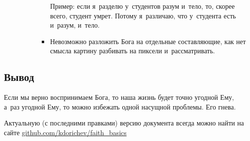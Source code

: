 \documentclass[a4paper,12pt]{article}
\begin{document}
\begin{enumerate}
\begin{itemize}
\begin{enumerate}
\begin{itemize}
            Пример: если я~разделю у~студентов разум и~тело, то, скорее всего, студент умрет. Потому я~различаю, что у~студента есть и~разум, и~тело.
            \item Невозможно разложить Бога на отдельные составляющие, как нет смысла картину разбивать на пиксели и~рассматривать.
        \end{itemize}
    \end{enumerate}
    \end{itemize}
\end{enumerate}

\subsection{Вывод}

Если мы верно воспринимаем Бога, то наша жизнь будет точно угодной Ему, а~раз угодной Ему, то можно избежать одной насущной проблемы. Его гнева.

\vfill
\tiny{Актуальную (с последними правками) версию документа всегда можно найти на сайте \href{https://github.com/kdorichev/faith_basics/blob/main/God/lesson_3.1.pdf}{github.com/kdorichev/faith\_basics}}
\end{document}
